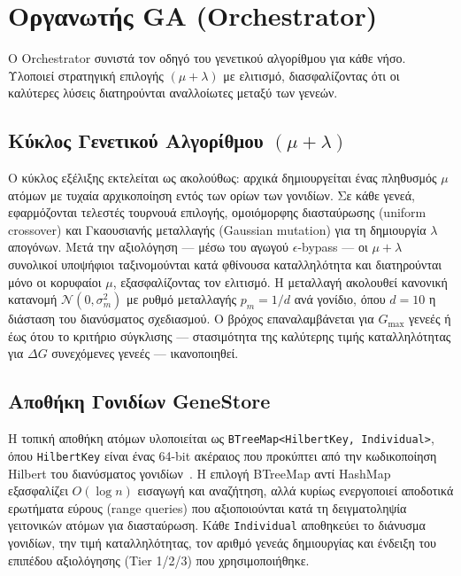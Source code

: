 \section{Οργανωτής GA (Orchestrator)}
\label{sec:impl_orchestrator}

Ο Orchestrator συνιστά τον οδηγό του γενετικού αλγορίθμου για κάθε νήσο. Υλοποιεί στρατηγική επιλογής $(\mu + \lambda)$ με ελιτισμό, διασφαλίζοντας ότι οι καλύτερες λύσεις διατηρούνται αναλλοίωτες μεταξύ των γενεών.

\subsection{Κύκλος Γενετικού Αλγορίθμου $(\mu+\lambda)$}
\label{subsec:impl_ga_loop}

Ο κύκλος εξέλιξης εκτελείται ως ακολούθως: αρχικά δημιουργείται ένας πληθυσμός $\mu$ ατόμων με τυχαία αρχικοποίηση εντός των ορίων των γονιδίων. Σε κάθε γενεά, εφαρμόζονται τελεστές τουρνουά επιλογής, ομοιόμορφης διασταύρωσης (uniform crossover) και Γκαουσιανής μεταλλαγής (Gaussian mutation) για τη δημιουργία $\lambda$ απογόνων. Μετά την αξιολόγηση — μέσω του αγωγού $\epsilon$-bypass — οι $\mu + \lambda$ συνολικοί υποψήφιοι ταξινομούνται κατά φθίνουσα καταλληλότητα και διατηρούνται μόνο οι κορυφαίοι $\mu$, εξασφαλίζοντας τον ελιτισμό. Η μεταλλαγή ακολουθεί κανονική κατανομή $\mathcal{N}(0, \sigma_m^2)$ με ρυθμό μεταλλαγής $p_m = 1/d$ ανά γονίδιο, όπου $d = 10$ η διάσταση του διανύσματος σχεδιασμού. Ο βρόχος επαναλαμβάνεται για $G_{\max}$ γενεές ή έως ότου το κριτήριο σύγκλισης — στασιμότητα της καλύτερης τιμής καταλληλότητας για $\Delta G$ συνεχόμενες γενεές — ικανοποιηθεί.

\subsection{Αποθήκη Γονιδίων GeneStore}
\label{subsec:impl_genestore}

Η τοπική αποθήκη ατόμων υλοποιείται ως \texttt{BTreeMap<HilbertKey, Individual>}, όπου \texttt{HilbertKey} είναι ένας 64-bit ακέραιος που προκύπτει από την κωδικοποίηση Hilbert του διανύσματος γονιδίων~\cite{skilling2004hilbert}. Η επιλογή BTreeMap αντί HashMap εξασφαλίζει $O(\log n)$ εισαγωγή και αναζήτηση, αλλά κυρίως ενεργοποιεί αποδοτικά ερωτήματα εύρους (range queries) που αξιοποιούνται κατά τη δειγματοληψία γειτονικών ατόμων για διασταύρωση. Κάθε \texttt{Individual} αποθηκεύει το διάνυσμα γονιδίων, την τιμή καταλληλότητας, τον αριθμό γενεάς δημιουργίας και ένδειξη του επιπέδου αξιολόγησης (Tier 1/2/3) που χρησιμοποιήθηκε.

